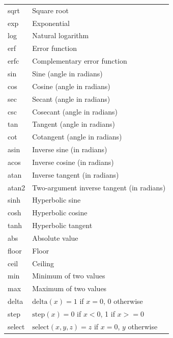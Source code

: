 {\begin{center}
\begin{tabular}{|l|l|}
\hline
sqrt & Square root\\
exp & Exponential\\
log & Natural logarithm\\
erf & Error function\\
erfc & Complementary error function\\
\hline
sin & Sine (angle in radians)\\
cos & Cosine (angle in radians)\\
sec & Secant (angle in radians)\\
csc & Cosecant  (angle in radians)\\
tan & Tangent (angle in radians)\\
cot & Cotangent (angle in radians)\\
asin & Inverse sine (in radians)\\
acos & Inverse cosine (in radians)\\
atan & Inverse tangent (in radians)\\
atan2 & Two-argument inverse tangent (in radians)\\
\hline
sinh & Hyperbolic sine\\
cosh & Hyperbolic cosine\\
tanh & Hyperbolic tangent\\
\hline
abs & Absolute value\\
floor & Floor\\
ceil & Ceiling\\
min & Minimum of two values\\
max & Maximum of two values\\
delta & $\mathrm{delta}(x) = 1$ if $x=0$, 0 otherwise\\
step & $\mathrm{step}(x) = 0$ if $x<0$, 1 if $x>=0$\\
select & $\mathrm{select}(x, y, z) = z$ if $x=0$, $y$ otherwise\\
\hline
\end{tabular}
\end{center}
}


